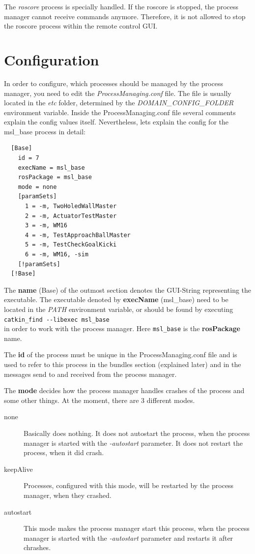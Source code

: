 The \emph{roscore} process is specially handled. If the roscore is stopped, the process manager cannot receive commands anymore. Therefore, it is not allowed to stop the roscore process within the remote control GUI.

\section{Configuration}
\label{sec:Configuration}

In order to configure, which processes should be managed by the process manager, you need to edit the \emph{ProcessManaging.conf} file. The file is usually located in the \emph{etc} folder, determined by the \emph{DOMAIN\_CONFIG\_FOLDER} environment variable. Inside the ProcessManaging.conf file several comments explain the config values itself. Nevertheless, lets explain the config for the msl\_base process in detail:

\begin{verbatim}
  [Base]
    id = 7
    execName = msl_base
    rosPackage = msl_base 
    mode = none
    [paramSets]
      1 = -m, TwoHoledWallMaster
      2 = -m, ActuatorTestMaster
      3 = -m, WM16
      4 = -m, TestApproachBallMaster
      5 = -m, TestCheckGoalKicki
      6 = -m, WM16, -sim
    [!paramSets]
  [!Base]
\end{verbatim}

The \textbf{name} (Base) of the outmost section denotes the GUI-String representing the executable. The executable denoted by \textbf{execName} (msl\_base) need to be located in the \emph{PATH} environment variable, or should be found by executing\\ 
\verb#catkin_find --libexec msl_base#\\
in order to work with the process manager. Here \verb#msl_base# is the \textbf{rosPackage} name.

The \textbf{id} of the process must be unique in the ProcessManaging.conf file and is used to refer to this process in the bundles section (explained later) and in the messages send to and received from the process manager.

The \textbf{mode} decides how the process manager handles crashes of the process and some other things. At the moment, there are 3 different modes.
\begin{description}
 \item [none] Basically does nothing. It does not autostart the process, when the process manager is started with the \emph{-autostart} parameter. It does not restart the process, when it did crash.
 \item [keepAlive] Processes, configured with this mode, will be restarted by the process manager, when they crashed.
 \item [autostart] This mode makes the process manager start this process, when the process manager is started with the \emph{-autostart} parameter and restarts it after chrashes.
\end{description}

